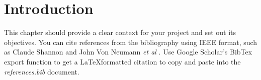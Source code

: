 \chapter{Introduction}

This chapter should provide a clear context for your project and set out its objectives. You can cite references from the bibliography using IEEE format, such as Claude Shannon \cite{shannon1948mathematical} and John Von Neumann \textit{et al} \cite{von2007theory}. Use Google Scholar's BibTex export function to get a \LaTeX formatted citation to copy and paste into the \textit{references.bib} document.
